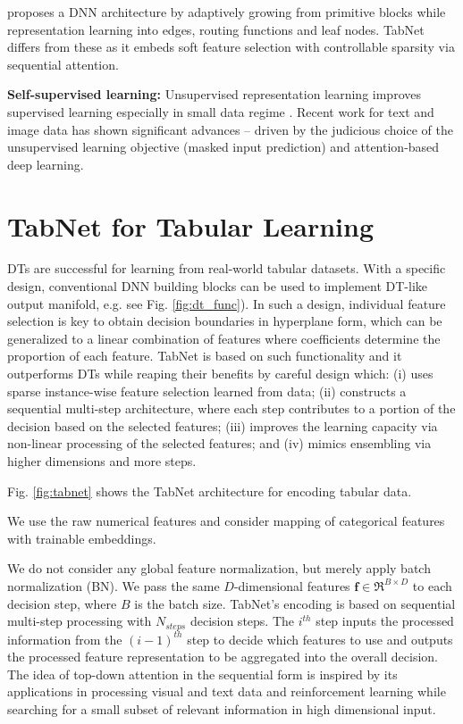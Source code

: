 \citep{ant} proposes a DNN architecture by adaptively growing from primitive blocks while representation learning into edges, routing functions and leaf nodes. TabNet differs from these as it embeds soft feature selection with controllable sparsity via sequential attention. 

{\bf Self-supervised learning:} Unsupervised representation learning improves supervised learning especially in small data regime \citep{self_taught}. Recent work for text \citep{bert} and image \citep{selfie} data has shown significant advances -- driven by the judicious choice of the unsupervised learning objective (masked input prediction) and attention-based deep learning.

\section{TabNet for Tabular Learning}

DTs are successful for learning from real-world tabular datasets. With a specific design, conventional DNN building blocks can be used to implement DT-like output manifold, e.g. see Fig. \ref{fig:dt_func}).
In such a design, individual feature selection is key to obtain decision boundaries in hyperplane form, which can be generalized to a linear combination of features where coefficients determine the proportion of each feature. TabNet is based on such functionality and it outperforms DTs while reaping their benefits by careful design which: (i) uses sparse instance-wise feature selection learned from data; (ii) constructs a sequential multi-step architecture, where each step contributes to a portion of the decision based on the selected features; (iii) improves the learning capacity via non-linear processing of the selected features; and (iv) mimics ensembling via higher dimensions and more steps.

Fig. \ref{fig:tabnet} shows the TabNet architecture for encoding tabular data. 

We use the raw numerical features and consider mapping of categorical features with trainable embeddings.

We do not consider any global feature normalization, but merely apply batch normalization (BN). We pass the same $D$-dimensional features $\mathbf{f} \in \Re ^ {B \times D}$ to each decision step, where $B$ is the batch size. TabNet's encoding is based on sequential multi-step processing with $N_{steps}$ decision steps. The $i^{th}$ step inputs the processed information from the $(i-1)^{th}$ step to decide which features to use and outputs the processed feature representation to be aggregated into the overall decision. The idea of top-down attention in the sequential form is inspired by its applications in processing visual and text data \citep{compositional_attention} and reinforcement learning \citep{S3A} while searching for a small subset of relevant information in high dimensional input. 

